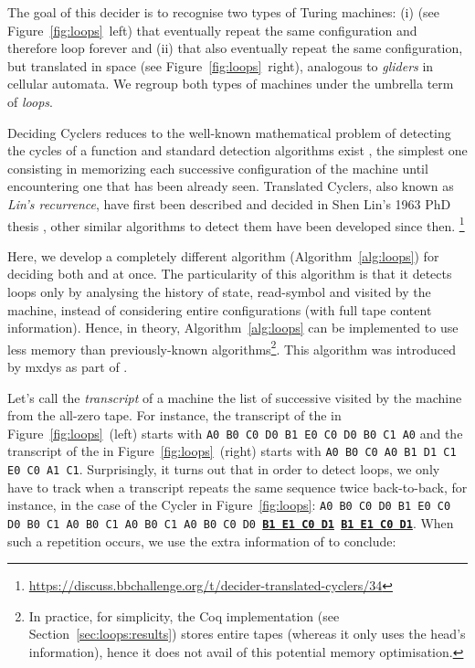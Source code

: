 
The goal of this decider is to recognise two types of Turing machines: (i) \textit{\cyclers} (see Figure~\ref{fig:loops}~left) that eventually repeat the same configuration and therefore loop forever and (ii) \textit{\TCs} that also eventually repeat the same configuration, but translated in space (see Figure~\ref{fig:loops}~right), analogous to \textit{gliders} in cellular automata. We regroup both types of machines under the umbrella term of \textit{loops}.

Deciding Cyclers reduces to the well-known mathematical problem of detecting the cycles of a function and standard detection algorithms exist \cite{wiki:Cycle_detection}, the simplest one consisting in memorizing each successive configuration of the machine until encountering one that has been already seen. Translated Cyclers, also known as \textit{Lin's recurrence}, have first been described and decided in Shen Lin's 1963 PhD thesis \cite{Lin1963}, other similar algorithms to detect them have been developed since then. \footnote{\url{https://discuss.bbchallenge.org/t/decider-translated-cyclers/34}}

Here, we develop a completely different algorithm (Algorithm~\ref{alg:loops}) for deciding both \cyclers and \TCs at once. The particularity of this algorithm is that it detects loops only by analysing the history of state, read-symbol and \headposs visited by the machine, instead of considering entire configurations (\ie with full tape content information). Hence, in theory, Algorithm~\ref{alg:loops} can be implemented to use less memory than previously-known algorithms\footnote{In practice, for simplicity, the Coq implementation (see Section~\ref{sec:loops:results}) stores entire tapes (whereas it only uses the head's information), hence it does not avail of this potential memory optimisation.}. This algorithm was introduced by mxdys as part of \CoqBB.

Let's call the \textit{transcript} of a machine the list of successive \ssps visited by the machine from the all-zero tape. For instance, the transcript of the \cycler in Figure~\ref{fig:loops}~(left) starts with \texttt{A0 B0 C0 D0 B1 E0 C0 D0 B0 C1 A0} and the transcript of the \TC in Figure~\ref{fig:loops}~(right) starts with \texttt{A0 B0 C0 A0 B1 D1 C1 E0 C0 A1 C1}. Surprisingly, it turns out that in order to detect loops, we only have to track when a transcript repeats the same sequence twice back-to-back, for instance, in the case of the Cycler in Figure~\ref{fig:loops}: \texttt{A0 B0 C0 D0 B1 E0 C0 D0 B0 C1 A0 B0 C1 A0 B0 C1 A0 B0 C0 D0 \textbf{\underline{B1 E1 C0 D1}} \textbf{\underline{B1 E1 C0 D1}}}. When such a repetition occurs, we use the extra information of \headpos to conclude:

